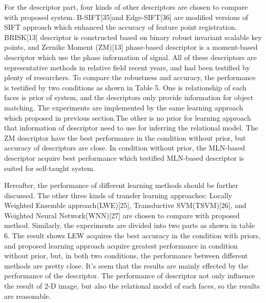 \documentclass[journal]{IEEEtran}
\begin{document}
For the descriptor part, four kinds of other descriptors are chosen to compare with proposed system. B-SIFT[35]and Edge-SIFT[36] are modified versions of SIFT approach which enhanced the accuracy of feature point registration. BRISK[13] descriptor is constructed based on binary robust invariant scalable key points, and Zernike Moment (ZM)[13] phase-based descriptor is a moment-based descriptor which use the phase information of signal. All of these descriptors are representative methods in relative field recent years, and had been testified by plenty of researchers. To compare the robustness and accuracy, the performance is testified by two conditions as shown in Table 5. One is relationship of each faces is prior of system, and the descriptors only provide information for object matching. The experiments are implemented by the same learning approach which proposed in previous section.The other is no prior for learning approach that information of descriptor need to use for inferring the relational model. The ZM descriptor have the best performance in the condition without prior, but accuracy of descriptors are close. In condition without prior, the MLN-based descriptor acquire best performance which testified MLN-based descriptor is suited for self-taught system. 

Hereafter, the performance of different learning methods should be further discussed. The other three kinds of transfer learning approaches: Locally Weighted Ensemble approach(LWE)[25], Transductive SVM(TSVM)[26], and Weighted Neural Network(WNN)[27] are chosen to compare with proposed method. Similarly, the experiments are divided into two parts as shown in table 6. The result shows LEW acquires the best accuracy in the condition with priors, and proposed learning approach acquire greatest performance in condition without prior, but, in both two conditions, the performance between different methods are pretty close. It's seem that the results are mainly effected by the performance of the descriptor. The performance of descriptor not only influence the result of 2-D image, but also the relational model of each faces, so the results are reasonable. 

\newcommand{\tabincell}[2]{\begin{tabular}{@{}#1@{}}#2\end{tabular}}
\end{document}
